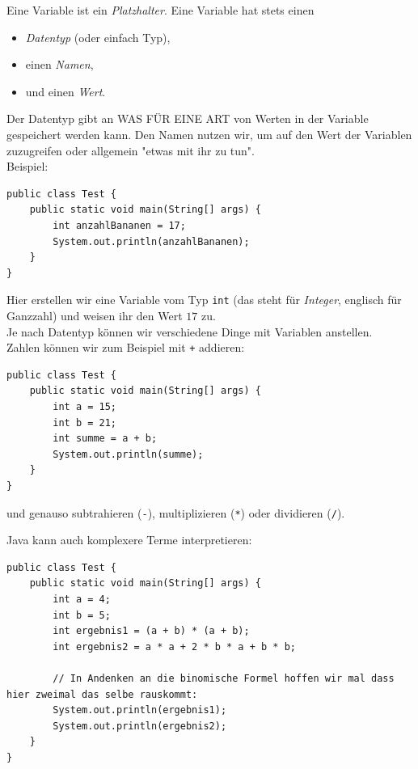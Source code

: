 \documentclass[ngerman,11pt]{article}
\begin{document}
    Eine Variable ist ein \textit{Platzhalter}.
    Eine Variable hat stets einen
    \begin{itemize}
        \item \textit{Datentyp} (oder einfach Typ),
        \item einen \textit{Namen},
        \item und einen \textit{Wert}.
    \end{itemize}

    Der Datentyp gibt an WAS FÜR EINE ART von Werten in der Variable gespeichert werden kann.
    Den Namen nutzen wir, um auf den Wert der Variablen zuzugreifen oder allgemein "etwas mit ihr zu tun".\\

    Beispiel:

    \begin{lstlisting}[caption=Variable]
public class Test {
    public static void main(String[] args) {
        int anzahlBananen = 17;
        System.out.println(anzahlBananen);
    }
}
    \end{lstlisting}

    Hier erstellen wir eine Variable vom Typ \lstinline{int} (das steht für \textit{Integer}, englisch für Ganzzahl)
    und weisen ihr den Wert $17$ zu. \\

    Je nach Datentyp können wir verschiedene Dinge mit Variablen anstellen. \\

    Zahlen können wir zum Beispiel mit \lstinline{+} addieren:

    \begin{lstlisting}[caption=Summe zweier Ganzzahlen]
public class Test {
    public static void main(String[] args) {
        int a = 15;
        int b = 21;
        int summe = a + b;
        System.out.println(summe);
    }
}
    \end{lstlisting}

    und genauso subtrahieren (\lstinline{-}), multiplizieren (\lstinline{*}) oder dividieren (\lstinline{/}).

    Java kann auch komplexere Terme interpretieren:

\begin{lstlisting}[caption=binomische Formel]
public class Test {
    public static void main(String[] args) {
        int a = 4;
        int b = 5;
        int ergebnis1 = (a + b) * (a + b);
        int ergebnis2 = a * a + 2 * b * a + b * b;

        // In Andenken an die binomische Formel hoffen wir mal dass hier zweimal das selbe rauskommt:
        System.out.println(ergebnis1);
        System.out.println(ergebnis2);
    }
}
\end{lstlisting}
\end{document}
